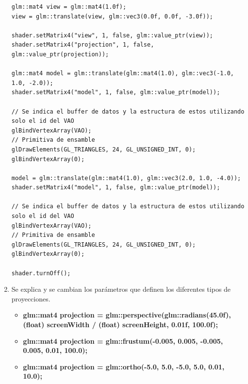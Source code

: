 \documentclass[11pt, english]{article}
\begin{document}
\begin{enumerate}
\begin{lstlisting}[label={list:third},caption={Ejemplo para colocar dos cubos.}, style=customc]
glm::mat4 view = glm::mat4(1.0f);
view = glm::translate(view, glm::vec3(0.0f, 0.0f, -3.0f));

shader.setMatrix4("view", 1, false, glm::value_ptr(view));
shader.setMatrix4("projection", 1, false, glm::value_ptr(projection));

glm::mat4 model = glm::translate(glm::mat4(1.0), glm::vec3(-1.0, 1.0, -2.0));
shader.setMatrix4("model", 1, false, glm::value_ptr(model));

// Se indica el buffer de datos y la estructura de estos utilizando solo el id del VAO
glBindVertexArray(VAO);
// Primitiva de ensamble
glDrawElements(GL_TRIANGLES, 24, GL_UNSIGNED_INT, 0);
glBindVertexArray(0);

model = glm::translate(glm::mat4(1.0), glm::vec3(2.0, 1.0, -4.0));
shader.setMatrix4("model", 1, false, glm::value_ptr(model));

// Se indica el buffer de datos y la estructura de estos utilizando solo el id del VAO
glBindVertexArray(VAO);
// Primitiva de ensamble
glDrawElements(GL_TRIANGLES, 24, GL_UNSIGNED_INT, 0);
glBindVertexArray(0);

shader.turnOff();
\end{lstlisting}

\item Se explica y se cambian los parámetros que definen los diferentes tipos de
proyecciones.

\begin{itemize}
\item \textbf{glm::mat4 projection = glm::perspective(glm::radians(45.0f), (float) screenWidth / (float) screenHeight, 0.01f, 100.0f);}
\item \textbf{glm::mat4 projection = glm::frustum(-0.005, 0.005, -0.005, 0.005, 0.01, 100.0);}
\item \textbf{glm::mat4 projection = glm::ortho(-5.0, 5.0, -5.0, 5.0, 0.01, 10.0);}
\end{itemize}
\end{enumerate}
\end{document}
